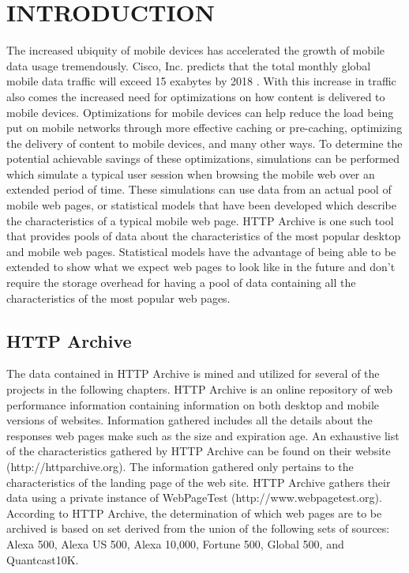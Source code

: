  \chapter{INTRODUCTION}
\label{ch:introduction}
The increased ubiquity of mobile devices has accelerated the growth of mobile data usage tremendously. Cisco, Inc. predicts that the total monthly global mobile data traffic will exceed 15 exabytes by 2018 \cite{VNI14}. With this increase in traffic also comes the increased need for optimizations on how content is delivered to mobile devices. Optimizations for mobile devices can help reduce the load being put on mobile networks through more effective caching or pre-caching, optimizing the delivery of content to mobile devices, and many other ways. To determine the potential achievable savings of these optimizations, simulations can be performed which simulate a typical user session when browsing the mobile web over an extended period of time. These simulations can use data from an actual pool of mobile web pages, or statistical models that have been developed which describe the characteristics of a typical mobile web page. HTTP Archive \cite{ht13} is one such tool that provides pools of data about the characteristics of the most popular desktop and mobile web pages. Statistical models have the advantage of being able to be extended to show what we expect web pages to look like in the future and don't require the storage overhead for having a pool of data containing all the characteristics of the most popular web pages.

\section*{HTTP Archive}
The data contained in HTTP Archive is mined and utilized for several of the projects in the following chapters. HTTP Archive is an online repository of web performance information containing information on both desktop and mobile versions of websites. Information gathered includes all the details about the responses web pages make such as the size and expiration age. An exhaustive list of the characteristics gathered by HTTP Archive can be found on their website (http://httparchive.org). The information gathered only pertains to the characteristics of the landing page of the web site. HTTP Archive gathers their data using a private instance of WebPageTest (http://www.webpagetest.org). According to HTTP Archive, the determination of which web pages are to be archived is based on set derived from the union of the following sets of sources: Alexa 500, Alexa US 500, Alexa 10,000, Fortune 500, Global 500, and Quantcast10K.